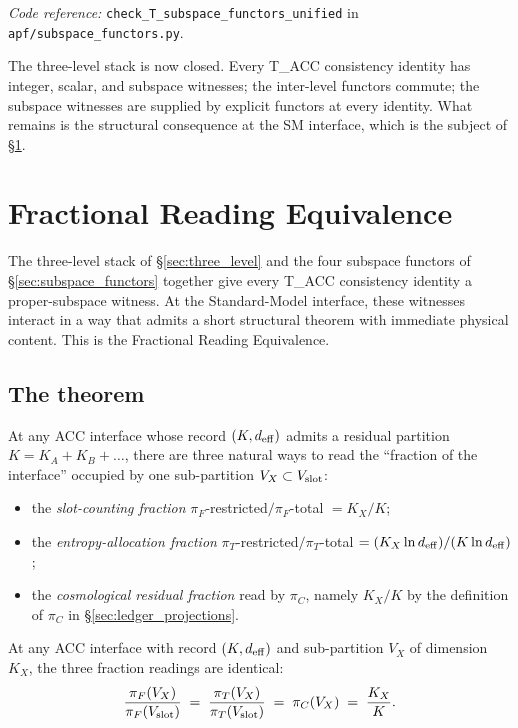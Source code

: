 \documentclass[11pt]{article}
\newcommand{\coderef}[2]{\smallskip\noindent\textit{Code reference:} \texttt{#1} in \texttt{#2}.}
\begin{document}
\coderef{check\_T\_subspace\_functors\_unified}{apf/subspace\_functors.py}

\smallskip

The three-level stack is now closed. Every T\_ACC consistency identity has integer, scalar, and subspace witnesses; the inter-level functors commute; the subspace witnesses are supplied by explicit functors at every identity. What remains is the structural consequence at the SM interface, which is the subject of \S\ref{sec:FRE}.

\section{Fractional Reading Equivalence}\label{sec:FRE}

The three-level stack of \S\ref{sec:three_level} and the four subspace functors of \S\ref{sec:subspace_functors} together give every T\_ACC consistency identity a proper-subspace witness. At the Standard-Model interface, these witnesses interact in a way that admits a short structural theorem with immediate physical content. This is the Fractional Reading Equivalence.

\subsection{The theorem}\label{sec:FRE_theorem}

At any ACC interface whose record $(K, d_{\rm eff})$ admits a residual partition $K = K_A + K_B + \dots$, there are three natural ways to read the ``fraction of the interface'' occupied by one sub-partition $V_X \subset V_{\rm slot}$:
\begin{itemize}[leftmargin=2em,itemsep=4pt]
    \item the \emph{slot-counting fraction} $\pi_F$-restricted$/\pi_F$-total $= K_X / K$;
    \item the \emph{entropy-allocation fraction} $\pi_T$-restricted$/\pi_T$-total $= (K_X \ln d_{\rm eff}) / (K \ln d_{\rm eff})$;
    \item the \emph{cosmological residual fraction} read by $\pi_C$, namely $K_X / K$ by the definition of $\pi_C$ in \S\ref{sec:ledger_projections}.
\end{itemize}

\begin{tcolorbox}[apfbox, title={Theorem --- Fractional Reading Equivalence (FRE)}]
At any ACC interface with record $(K, d_{\rm eff})$ and sub-partition $V_X$ of dimension $K_X$, the three fraction readings are identical:
\[
\frac{\pi_F(V_X)}{\pi_F(V_{\rm slot})}
\;=\;
\frac{\pi_T(V_X)}{\pi_T(V_{\rm slot})}
\;=\;
\pi_C(V_X)
\;=\;
\frac{K_X}{K}.
\]
\end{tcolorbox}
\end{document}

